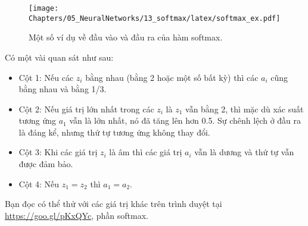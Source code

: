 \begin{figure}[t]
\centering
    \texttt{[image: Chapters/05\_NeuralNetworks/13\_softmax/latex/softmax\_ex.pdf]}
    \caption[]{Một số ví dụ về đầu vào và đầu ra của hàm softmax.}
    \label{fig:13_3}
\end{figure}
 \newpage 
Có một vài quan sát như sau:  
\begin{itemize}
\item Cột 1: Nếu các $z_i$ bằng nhau (bằng 2 hoặc một số bất kỳ) thì các $a_i$
cũng bằng nhau
và bằng 1/3.
 
\item Cột 2: Nếu giá trị lớn nhất trong các $z_i$ là $z_1$ vẫn bằng 2, thì mặc
dù xác suất
tương ứng $a_1$ vẫn là lớn nhất, nó đã tăng lên hơn 0.5. Sự chênh lệch ở
đầu ra là đáng kể, nhưng thứ tự tương ứng không thay đổi. 

\item Cột 3: Khi các giá trị $z_i$ là âm thì các giá trị $a_i$ vẫn là dương và thứ tự vẫn được đảm bảo.  
 
\item Cột 4: Nếu $z_1 = z_2$ thì $a_1 = a_2$. 
\end{itemize}
 
Bạn đọc có thể thử với các giá trị khác trên trình duyệt tại
\url{https://goo.gl/pKxQYc}, phần softmax.
 
 
